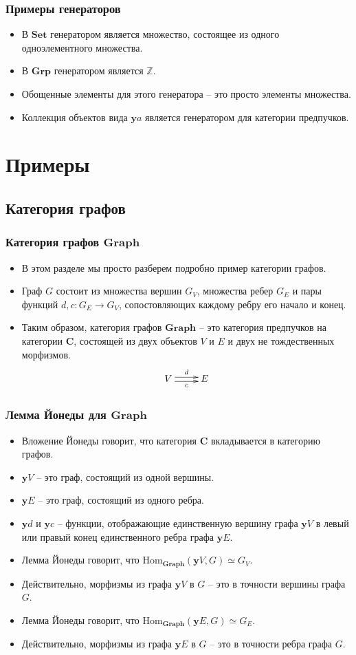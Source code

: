 \documentclass{beamer}
\theoremstyle{definition}
\newcommand{\cat}[1]{\mathbf{#1}}
\renewcommand{\C}{\cat{C}}
\newcommand{\y}{\cat{y}}
\newcommand{\Set}{\cat{Set}}
\newcommand{\Grp}{\cat{Grp}}
\newcommand{\Hom}{\mathrm{Hom}}
\begin{document}
\begin{frame}
\frametitle{Примеры генераторов}
\begin{itemize}
\item В $\Set$ генератором является множество, состоящее из одного одноэлементного множества.
\item В $\Grp$ генератором является $\mathbb{Z}$.
\item Обощенные элементы для этого генератора -- это просто элементы множества.
\item Коллекция объектов вида $\y a$ является генератором для категории предпучков.
\end{itemize}
\end{frame}

\section{Примеры}

\subsection{Категория графов}

\begin{frame}
\frametitle{Категория графов $\cat{Graph}$}
\begin{itemize}
\item В этом разделе мы просто разберем подробно пример категории графов.
\item Граф $G$ состоит из множества вершин $G_V$, множества ребер $G_E$ и пары функций $d,c : G_E \to G_V$, сопостовляющих каждому ребру его начало и конец.
\item Таким образом, категория графов $\cat{Graph}$ -- это категория предпучков на категории $\C$, состоящей из двух объектов $V$ и $E$ и двух не тождественных морфизмов.
\[ \xymatrix{ V \ar@<-.5ex>[r]_c \ar@<.5ex>[r]^d & E } \]
\end{itemize}
\end{frame}

\begin{frame}
\frametitle{Лемма Йонеды для $\cat{Graph}$}
\begin{itemize}
\item Вложение Йонеды говорит, что категория $\C$ вкладывается в категорию графов.
\item $\y V$ -- это граф, состоящий из одной вершины.
\item $\y E$ -- это граф, состоящий из одного ребра.
\item $\y d$ и $\y c$ -- функции, отображающие единственную вершину графа $\y V$ в левый или правый конец единственного ребра графа $\y E$.
\item Лемма Йонеды говорит, что $\Hom_{\cat{Graph}}(\y V, G) \simeq G_V$.
\item Действительно, морфизмы из графа $\y V$ в $G$ -- это в точности вершины графа $G$.
\item Лемма Йонеды говорит, что $\Hom_{\cat{Graph}}(\y E, G) \simeq G_E$.
\item Действительно, морфизмы из графа $\y E$ в $G$ -- это в точности ребра графа $G$.
\end{itemize}
\end{frame}
\end{document}
